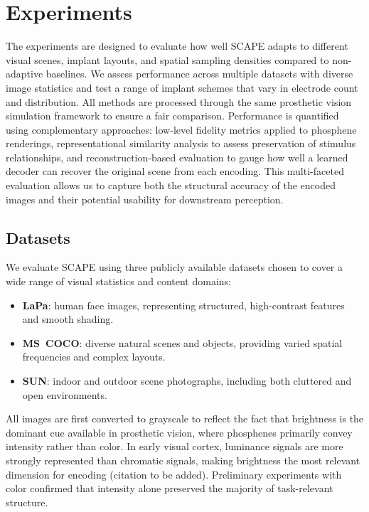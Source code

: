 \section{Experiments}
\label{sec:experiments}

The experiments are designed to evaluate how well SCAPE adapts to different visual scenes, implant layouts, and spatial sampling densities compared to non-adaptive baselines.  
We assess performance across multiple datasets with diverse image statistics and test a range of implant schemes that vary in electrode count and distribution.  
All methods are processed through the same prosthetic vision simulation framework to ensure a fair comparison.  
Performance is quantified using complementary approaches: low-level fidelity metrics applied to phosphene renderings, representational similarity analysis to assess preservation of stimulus relationships, and reconstruction-based evaluation to gauge how well a learned decoder can recover the original scene from each encoding.  
This multi-faceted evaluation allows us to capture both the structural accuracy of the encoded images and their potential usability for downstream perception.


\subsection{Datasets}
We evaluate SCAPE using three publicly available datasets chosen to cover a wide range of visual statistics and content domains:
\begin{itemize}
    \item \textbf{LaPa}: human face images, representing structured, high-contrast features and smooth shading.
    \item \textbf{MS~COCO}: diverse natural scenes and objects, providing varied spatial frequencies and complex layouts.
    \item \textbf{SUN}: indoor and outdoor scene photographs, including both cluttered and open environments.
\end{itemize}

All images are first converted to grayscale to reflect the fact that brightness is the dominant cue available in prosthetic vision, where phosphenes primarily convey intensity rather than color.  
In early visual cortex, luminance signals are more strongly represented than chromatic signals, making brightness the most relevant dimension for encoding (citation to be added).  
Preliminary experiments with color confirmed that intensity alone preserved the majority of task-relevant structure.

